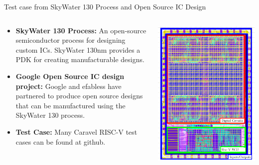 \documentclass[aspectratio=169]{beamer} %
\begin{document}
\begin{frame}{Test case from SkyWater 130 Process and Open Source IC Design}
    \begin{columns}[T]
        \begin{column}{.6\textwidth}
        \begin{itemize}
        \item \textbf{SkyWater 130 Process:} An open-source semiconductor process for designing custom ICs. SkyWater 130nm provides a PDK for creating manufacturable designs.
        \item \textbf{Google Open Source IC design project:} Google and efabless have partnered to produce open source designs that can be manufactured using the SkyWater 130 process.
        \item \textbf{Test Case:} Many Caravel RISC-V test cases can be found at github.
        \end{itemize}
        \end{column}
        \begin{column}{.4\textwidth}
        \includegraphics[width=\textwidth,height=0.8\textheight,keepaspectratio]{caravel.png}
        \end{column}
    \end{columns}
    \end{frame}
\end{document}
